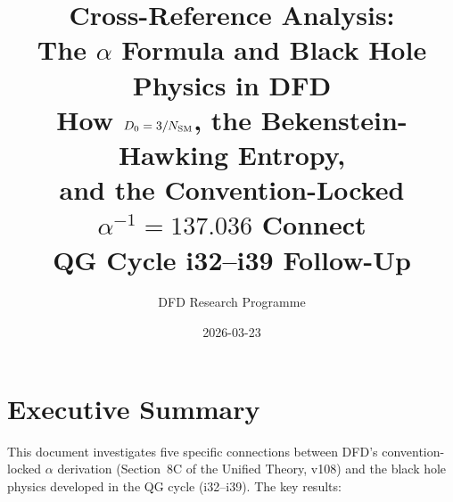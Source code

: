 \documentclass[11pt,a4paper]{article}
\title{Cross-Reference Analysis:\\
The $\alpha$ Formula and Black Hole Physics in DFD\\[6pt]
\large How $D_0 = 3/N_{\rm SM}$, the Bekenstein-Hawking Entropy,\\
and the Convention-Locked $\alpha^{-1} = 137.036$ Connect\\[6pt]
\normalsize QG Cycle i32--i39 Follow-Up}
\author{DFD Research Programme}
\date{2026-03-23}
\begin{document}
\maketitle
\tableofcontents
\newpage

\section{Executive Summary}
\label{sec:summary}

This document investigates five specific connections between DFD's convention-locked $\alpha$ derivation (Section~8C of the Unified Theory, v108) and the black hole physics developed in the QG cycle (i32--i39). The key results:
\end{document}
